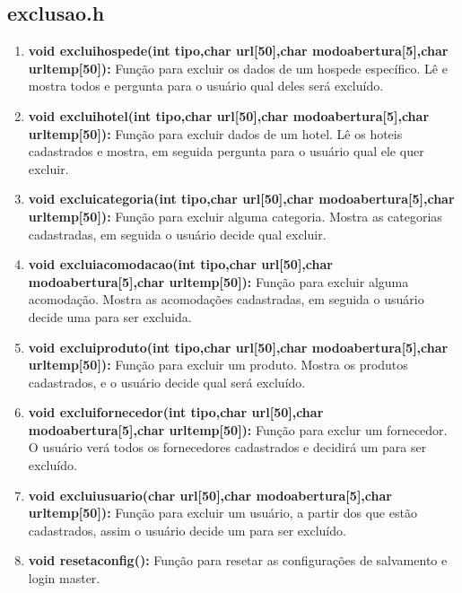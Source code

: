 \documentclass{article}
\begin{document}
\subsection{exclusao.h}
\begin{enumerate}
	\item \textbf{void excluihospede(int tipo,char url[50],char modoabertura[5],char urltemp[50]): }Função para excluir os dados de um hospede específico. Lê e mostra todos e pergunta para o usuário qual deles será excluído.\\
	\item \textbf{void excluihotel(int tipo,char url[50],char modoabertura[5],char urltemp[50]): }Função para excluir dados de um hotel. Lê os hoteis cadastrados e mostra, em seguida pergunta para o usuário qual ele quer excluir.\\
	\item \textbf{void excluicategoria(int tipo,char url[50],char modoabertura[5],char urltemp[50]): }Função para excluir alguma categoria. Mostra as categorias cadastradas, em seguida o usuário decide qual excluir.\\
	\item \textbf{void excluiacomodacao(int tipo,char url[50],char modoabertura[5],char urltemp[50]): }Função para excluir alguma acomodação. Mostra as acomodações cadastradas, em seguida o usuário decide uma para ser excluida.\\
	\item \textbf{void excluiproduto(int tipo,char url[50],char modoabertura[5],char urltemp[50]): }Função para excluir um produto. Mostra os produtos cadastrados, e o usuário decide qual será excluído.\\
	\item \textbf{void excluifornecedor(int tipo,char url[50],char modoabertura[5],char urltemp[50]): }Função para exclur um fornecedor. O usuário verá todos os fornecedores cadastrados e decidirá um para ser excluído.\\
	\item \textbf{void excluiusuario(char url[50],char modoabertura[5],char urltemp[50]): }Função para excluir um usuário, a partir dos que estão cadastrados, assim o usuário decide um para ser excluído.\\
	\item \textbf{void resetaconfig(): }Função para resetar as configurações de salvamento e login master.\\
\end{enumerate}
\end{document}
